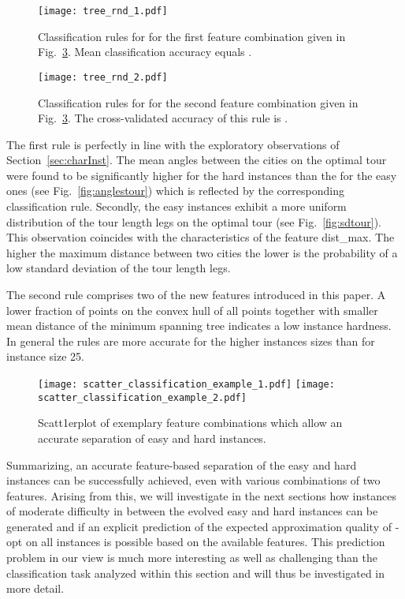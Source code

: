 \documentclass{article}
\begin{document}
\begin{figure}
  \centering
  \texttt{[image: tree\_rnd\_1.pdf]}
  \caption{Classification rules for  for the first feature
    combination given in Fig.~\ref{fig:class2d}. Mean classification
    accuracy equals .}
  \label{fig:classrules1}
\end{figure}

\begin{figure}
  \centering
  \texttt{[image: tree\_rnd\_2.pdf]}
  \caption{Classification rules for  for the second feature
    combination given in Fig.~\ref{fig:class2d}. The cross-validated
    accuracy of this rule is .}
  \label{fig:classrules2}
\end{figure}

The first rule is perfectly in line with the exploratory observations
of Section~\ref{sec:charInst}. The mean angles between the cities on
the optimal tour were found to be significantly higher for the hard
instances than the for the easy ones (see Fig.~\ref{fig:anglestour})
which is reflected by the corresponding classification rule. Secondly, the
easy instances exhibit a more uniform distribution of the tour length
legs on the optimal tour (see Fig.~\ref{fig:sdtour}). This observation
coincides with the characteristics of the feature dist\_max. The
higher the maximum distance between two cities the lower is the
probability of a low standard deviation of the tour length legs.

The second rule comprises two of the new features introduced in this
paper. A lower fraction of points on the convex hull of all points
together with smaller mean distance of the minimum spanning tree
indicates a low instance hardness. In general the rules are more
accurate for the higher instances sizes than for instance size 25.

\begin{figure}[tb]
  \centering
  \texttt{[image: scatter\_classification\_example\_1.pdf]}
  \texttt{[image: scatter\_classification\_example\_2.pdf]}
  \caption{Scatt1erplot of exemplary feature combinations which allow
    an accurate separation of easy and hard instances. }
  \label{fig:class2d}
\end{figure}

Summarizing, an accurate feature-based separation of the easy and hard
instances can be successfully achieved, even with various combinations
of two features. Arising from this, we will investigate in the next
sections how instances of moderate difficulty in between the evolved
easy and hard instances can be generated and if an explicit prediction
of the expected approximation quality of -opt on all instances is
possible based on the available features. This prediction problem in
our view is much more interesting as well as challenging than the
classification task analyzed within this section and will thus be
investigated in more detail.
\end{document}

